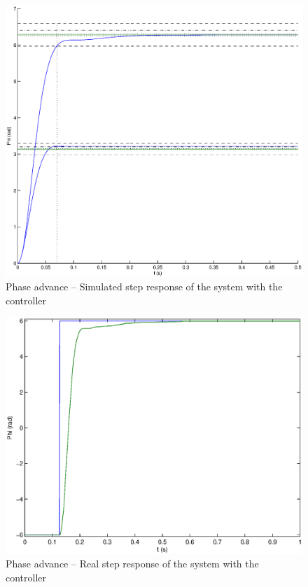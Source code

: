 \begin{center}
 \begin{figure}[ht]
 \includegraphics[width=\linewidth]{fig/step_simu_avance.eps}
 \caption{Phase advance -- Simulated step response of the system with the controller}
 \label{step_simu_avance}
 \end{figure}
\end{center}


\begin{center}
 \begin{figure}[ht]
 \includegraphics[width=\linewidth]{fig/step_true_avance.eps}
 \caption{Phase advance -- Real step response of the system with the controller}
 \label{step_true_advance}
 \end{figure}
\end{center}


